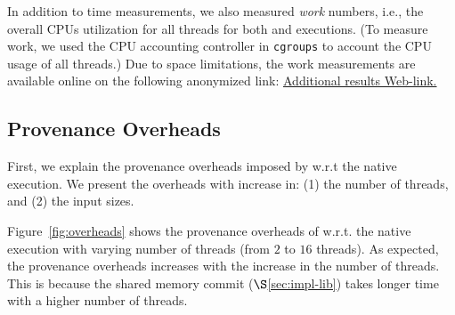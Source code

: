  In addition to time measurements, we also measured  {\em work} numbers, i.e., the overall CPUs utilization for all threads for both \pthreads and \projecttitle executions. (To measure work, we used the CPU accounting controller in {\tt cgroups} to account the CPU usage of all threads.) Due to space limitations, the work measurements are available online on the following anonymized link:  \href{https://goo.gl/0wp1kC}{Additional results Web-link.}




\subsection{Provenance Overheads}
\label{subsec:overheads}
First, we explain the provenance overheads imposed by \projecttitle w.r.t the native \pthreads execution.  We present the overheads with increase in: (1) the number of threads, and (2)  the input sizes.


 Figure~\ref{fig:overheads} shows the provenance overheads of \projecttitle w.r.t. the native \pthreads execution with varying number of
threads (from $2$ to $16$ threads). As expected, the provenance overheads increases with the increase in the number of threads. This is because the shared memory commit ($\S$\ref{sec:impl-lib}) takes longer time with a higher number of threads. 


